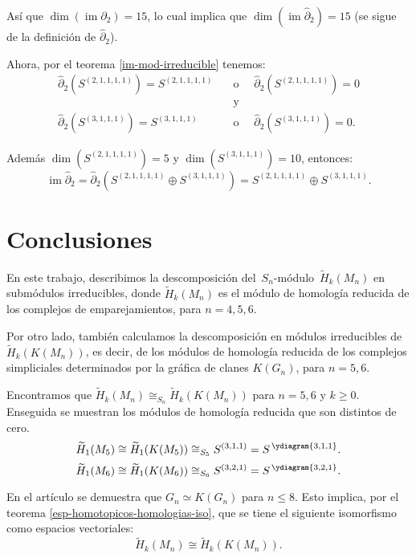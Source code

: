 \documentclass[12pt]{book}
\theoremstyle{definition}
\DeclareMathOperator{\im}{im}
\newcounter{in}
\newcounter{ini}
\begin{document}
Así que $\dim(\im\partial_{2})=15$, lo cual implica que
$\dim(\im\widehat\partial_{2})=15$ (se sigue de la definición de
$\widehat\partial_{2}$).

Ahora, por el teorema \ref{im-mod-irreducible} tenemos:
\begin{align*}
  \widehat\partial_{2}(S^{(2,1,1,1,1)})=S^{(2,1,1,1,1)} \quad &\mbox{o
  }\quad \widehat\partial_{2}(S^{(2,1,1,1,1)})=0\\
  &\mbox{y}\\
  \widehat\partial_{2}(S^{(3,1,1,1)})=S^{(3,1,1,1)} \quad &\mbox{o }\quad \widehat\partial_{2}(S^{(3,1,1,1)})=0.
\end{align*}

Además $\dim(S^{(2,1,1,1,1)})=5$ y $\dim(S^{(3,1,1,1)})=10$, entonces:
$$\im\widehat\partial_{2}=\widehat\partial_{2}(S^{(2,1,1,1,1)}\oplus S^{(3,1,1,1)})=S^{(2,1,1,1,1)}\oplus S^{(3,1,1,1)}.$$

\chapter*{Conclusiones}
 
En este trabajo, describimos la descomposición 
del~$S_{n}$-módulo~$\widetilde H_{k}(M_{n})$ en submódulos irreducibles, donde
$\widetilde H_{k}(M_{n})$ es el módulo de homología reducida de los
complejos de emparejamientos, para $n=4,5,6$.

Por otro lado, también calculamos la descomposición en módulos
irreducibles de $\widetilde H_{k}(K(M_{n}))$, es decir, de los módulos de
homología reducida de los complejos simpliciales determinados por
la gráfica de clanes $K(G_{n})$, para $n=5,6$.

Encontramos que $\widetilde H_{k}(M_{n})\cong_{S_n} \widetilde H_{k}(K(M_{n}))$ para
$n=5,6$ y $k\geq0$. Enseguida se muestran los módulos de homología reducida que son distintos de cero.
\begin{equation*}
  \widetilde H_{1}(M_{5})\cong\widetilde H_{1}(K(M_{5}))\cong_{S_{5}} S^{(3,1,1)}=S^{\,\ydiagram{3,1,1}}.
\end{equation*}
\begin{equation*}
  \widetilde H_{1}(M_{6})\cong\widetilde H_{1}(K(M_{6}))\cong_{S_{6}} S^{(3,2,1)}=S^{\,\ydiagram{3,2,1}}.
\end{equation*}

En el artículo \cite{larrion2009clique} se demuestra que $G_{n}\simeq
K(G_{n})$ para $n\leq 8$. Esto implica, por el teorema
\ref{esp-homotopicos-homologias-iso}, que
se tiene el siguiente isomorfismo como espacios vectoriales:
\begin{equation*}
  \label{equ:iso}
  \widetilde H_{k}(M_{n})\cong \widetilde H_{k}(K(M_{n})).
\end{equation*}
\end{document}
